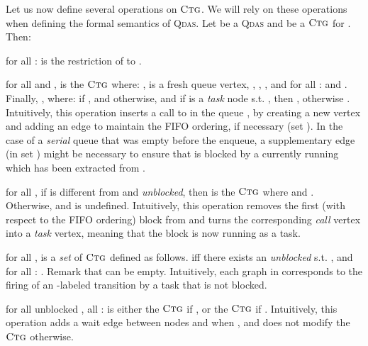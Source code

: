 \documentclass[runningheads,oribibl,]{article}
\newcommand{\qdas}{\textsc{Qdas}\xspace}
\newcommand{\ctg}{\ensuremath{\textsc{Ctg}}\xspace}
\newenvironment{myitemize}{\begin{list}{\labelitemi}{\setlength{\topsep}{4pt}\setlength{\partopsep}{0pt}
\setlength{\itemsep}{0pt}
\setlength{\itemindent}{0ex}
\setlength{\listparindent}{0ex}
\setlength{\leftmargin}{4ex}\setlength{\labelwidth}{2ex}
}}
{\end{list}}
\begin{document}
Let us now define several operations on \ctg. We will rely on these
operations when defining the formal semantics of \qdas. Let  be a
\qdas and 
be a \ctg for . Then:
\begin{myitemize}
\item for all :  is the restriction of
   to .
\item for all  and ,
   is the \ctg  where: ,  is a
  fresh queue vertex, , ,
  , and for all :
   and .  Finally,
  , where: 
   if
  ,
  and  otherwise, and  if  is a
  \emph{task} node s.t. , then ,
  otherwise . Intuitively, this operation inserts a
  call to  in the queue , by creating a new vertex  and
  adding an edge to maintain the FIFO ordering, if necessary (set
  ). In the case of a \emph{serial} queue that was empty before
  the enqueue, a supplementary edge (in set ) might be necessary
  to ensure that  is blocked by a currently running  which has
  been extracted from .
\item for all , if  is different from  and
  \emph{unblocked}, then  is the \ctg
   where
   and
  . Otherwise,  and
   is undefined. Intuitively, this operation
  removes the first (with respect to the FIFO ordering) block from 
  and turns the corresponding \emph{call} vertex  into a
  \emph{task} vertex, meaning that the block is now running as a
  task.\item for all , 
  is a \emph{set} of \ctg defined as follows.  iff there exists an
  \emph{unblocked}  s.t. ,  and
  for all : . Remark that
   can be empty. Intuitively, each graph in
   corresponds to the firing of an
  -labeled transition by a task that is not blocked.
\item for all unblocked , all :
   is either the \ctg  if
  , or the \ctg  if . Intuitively, this operation adds a wait
  edge between nodes  and  when , and does not
  modify the \ctg otherwise.
\end{myitemize}
\end{document}

